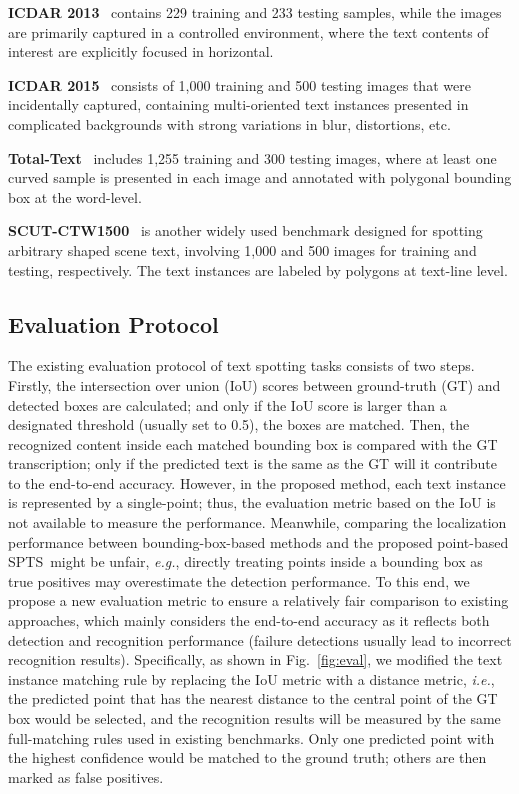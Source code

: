 \documentclass[sigconf]{acmart}
\newcommand{\methodName}{SPTS}
\begin{document}
{\bf ICDAR 2013}~\cite{karatzas2013icdar} 
contains 229 training and 233 testing samples, while the images are primarily captured in a controlled environment, where the text contents of interest are explicitly focused in horizontal.

    
{\bf ICDAR 2015}~\cite{karatzas2015icdar} 
consists of 1,000 training and 500 testing images that were incidentally captured, containing multi-oriented text instances presented in complicated backgrounds with strong variations in blur, distortions, etc.
    

{\bf Total-Text}~\cite{ch2017total} 
includes 1,255 training and 300 testing images, where at least one curved sample is presented in each image and annotated with polygonal bounding box at the word-level.
    
{\bf SCUT-CTW1500}~\cite{liu2019curved} 
is another widely used benchmark designed for spotting arbitrary shaped scene text, involving 1,000 and 500 images for training and testing, respectively. The text instances are labeled by polygons at text-line level.
    


\subsection{Evaluation Protocol}
\label{subsec:eval_protocol}
    
    


    
The existing evaluation protocol of text spotting tasks consists of two steps. Firstly, the intersection over union (IoU) scores between ground-truth (GT) and detected boxes are calculated; and only if the IoU score is larger than a designated threshold (usually set to 0.5), the boxes are matched. Then, the recognized content inside each matched bounding box is compared with the GT transcription; only if the predicted text is the same as the GT will it contribute to the end-to-end accuracy. However, in the proposed method, each text instance is represented by a single-point; thus, the evaluation metric based on the IoU is not available to measure the performance. Meanwhile, comparing the localization performance between bounding-box-based methods and the proposed point-based \methodName\ might be unfair, \emph{e.g.}, directly treating points inside a bounding box as true positives may overestimate the detection performance. To this end, we propose a new evaluation metric to ensure a relatively fair comparison to existing approaches, which mainly considers the end-to-end accuracy as it reflects both detection and recognition performance (failure detections usually lead to incorrect recognition results). Specifically, as shown in Fig.~\ref{fig:eval}, we modified the text instance matching rule by replacing the IoU metric with a distance metric, \emph{i.e.}, the predicted point that has the nearest distance to the central point of the GT box would be selected, and the recognition results will be measured by the same full-matching rules used in existing benchmarks. Only one predicted point with the highest confidence would be matched to the ground truth; others are then marked as false positives. 
    
\end{document}
